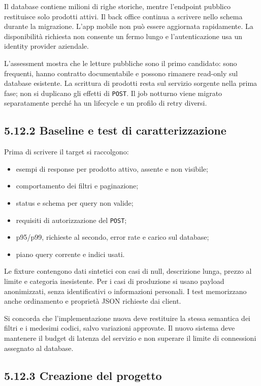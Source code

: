 \documentclass[
  italian,
  10pt,
]{book}
\providecommand{\tightlist}{%
  \setlength{\itemsep}{0pt}\setlength{\parskip}{0pt}}
\begin{document}
Il database contiene milioni di righe storiche, mentre l'endpoint
pubblico restituisce solo prodotti attivi. Il back office continua a
scrivere nello schema durante la migrazione. L'app mobile non può essere
aggiornata rapidamente. La disponibilità richiesta non consente un fermo
lungo e l'autenticazione usa un identity provider aziendale.

L'assessment mostra che le letture pubbliche sono il primo candidato:
sono frequenti, hanno contratto documentabile e possono rimanere
read-only sul database esistente. La scrittura di prodotti resta sul
servizio sorgente nella prima fase; non si duplicano gli effetti di
\texttt{POST}. Il job notturno viene migrato separatamente perché ha un
lifecycle e un profilo di retry diversi.

\subsection{5.12.2 Baseline e test di
caratterizzazione}\label{baseline-e-test-di-caratterizzazione}

Prima di scrivere il target si raccolgono:

\begin{itemize}
\tightlist
\item
  esempi di response per prodotto attivo, assente e non visibile;
\item
  comportamento dei filtri e paginazione;
\item
  status e schema per query non valide;
\item
  requisiti di autorizzazione del \texttt{POST};
\item
  p95/p99, richieste al secondo, error rate e carico sul database;
\item
  piano query corrente e indici usati.
\end{itemize}

Le fixture contengono dati sintetici con casi di null, descrizione
lunga, prezzo al limite e categoria inesistente. Per i casi di
produzione si usano payload anonimizzati, senza identificativi o
informazioni personali. I test memorizzano anche ordinamento e proprietà
JSON richieste dai client.

Si concorda che l'implementazione nuova deve restituire la stessa
semantica dei filtri e i medesimi codici, salvo variazioni approvate. Il
nuovo sistema deve mantenere il budget di latenza del servizio e non
superare il limite di connessioni assegnato al database.

\subsection{5.12.3 Creazione del progetto}\label{creazione-del-progetto}
\end{document}
